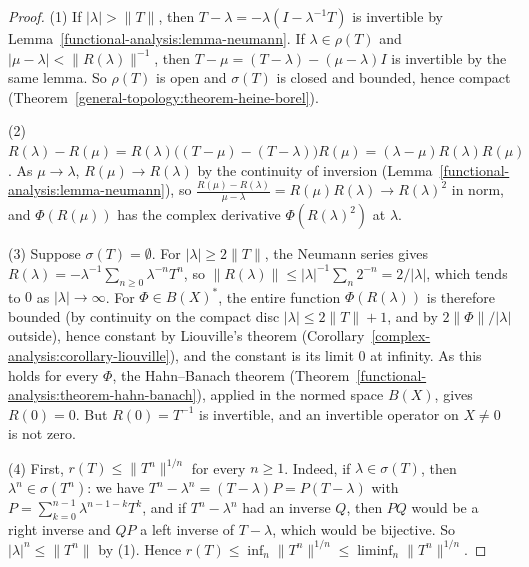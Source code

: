 \begin{proof}
(1) If $|\lambda| > \|T\|$, then $T - \lambda = -\lambda(I - \lambda^{-1}T)$ is invertible by Lemma~\ref{functional-analysis:lemma-neumann}. If $\lambda \in \rho(T)$ and $|\mu - \lambda| < \|R(\lambda)\|^{-1}$, then
$T - \mu = (T - \lambda) - (\mu - \lambda)I$ is invertible by the same lemma. So $\rho(T)$ is open and $\sigma(T)$ is closed and bounded, hence compact (Theorem~\ref{general-topology:theorem-heine-borel}).

(2) $R(\lambda) - R(\mu) = R(\lambda)\bigl((T - \mu) - (T - \lambda)\bigr)R(\mu) = (\lambda - \mu)R(\lambda)R(\mu)$. As $\mu \to \lambda$, $R(\mu) \to R(\lambda)$ by the continuity of inversion
(Lemma~\ref{functional-analysis:lemma-neumann}), so $\frac{R(\mu) - R(\lambda)}{\mu - \lambda} = R(\mu)R(\lambda) \to R(\lambda)^2$ in norm, and $\Phi(R(\mu))$ has the complex derivative $\Phi(R(\lambda)^2)$ at $\lambda$.

(3) Suppose $\sigma(T) = \emptyset$. For $|\lambda| \geq 2\|T\|$, the Neumann series gives $R(\lambda) = -\lambda^{-1}\sum_{n \geq 0}\lambda^{-n}T^n$, so $\|R(\lambda)\| \leq |\lambda|^{-1}\sum_n2^{-n} = 2/|\lambda|$, which tends to
$0$ as $|\lambda| \to \infty$. For $\Phi \in B(X)^*$, the entire function $\Phi(R(\lambda))$ is therefore bounded (by continuity on the compact disc $|\lambda| \leq 2\|T\| + 1$, and by $2\|\Phi\|/|\lambda|$ outside), hence
constant by Liouville's theorem (Corollary~\ref{complex-analysis:corollary-liouville}), and the constant is its limit $0$ at infinity. As this holds for every $\Phi$, the Hahn--Banach theorem
(Theorem~\ref{functional-analysis:theorem-hahn-banach}), applied in the normed space $B(X)$, gives $R(0) = 0$. But $R(0) = T^{-1}$ is invertible, and an invertible operator on $X \neq 0$ is not zero.

(4) First, $r(T) \leq \|T^n\|^{1/n}$ for every $n \geq 1$. Indeed, if $\lambda \in \sigma(T)$, then $\lambda^n \in \sigma(T^n)$: we have $T^n - \lambda^n = (T - \lambda)P = P(T - \lambda)$ with
$P = \sum_{k=0}^{n-1}\lambda^{n-1-k}T^k$, and if $T^n - \lambda^n$ had an inverse $Q$, then $PQ$ would be a right inverse and $QP$ a left inverse of $T - \lambda$, which would be bijective. So $|\lambda|^n \leq \|T^n\|$
by (1). Hence $r(T) \leq \inf_n\|T^n\|^{1/n} \leq \liminf_n\|T^n\|^{1/n}$.


\end{proof}
